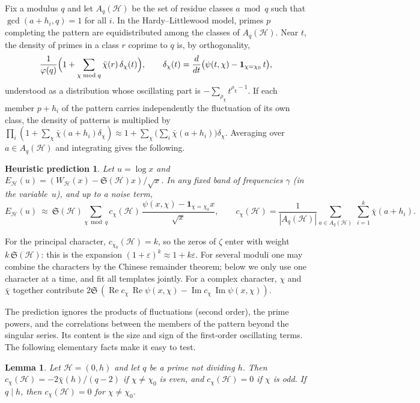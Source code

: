 \documentclass[11pt]{amsart}
\newtheorem{conjecture}{Heuristic prediction}
\newtheorem{lemma}{Lemma}
\theoremstyle{remark}
\newcommand{\Sing}{\mathfrak{S}}
\newcommand{\cH}{\mathcal{H}}
\begin{document}
Fix a modulus $q$ and let $A_q(\cH)$ be the set of residue classes $a\bmod q$ such that $\gcd(a+h_i,q)=1$ for all $i$. In the Hardy--Littlewood model, primes $p$ completing the pattern are equidistributed among the classes of $A_q(\cH)$. Near $t$, the density of primes in a class $r$ coprime to $q$ is, by orthogonality,
\[
\frac{1}{\varphi(q)}\Bigl(1+\sum_{\chi\bmod q}\bar\chi(r)\,\delta_\chi(t)\Bigr),
\qquad \delta_\chi(t)=\frac{d}{dt}\bigl(\psi(t,\chi)-\mathbf 1_{\chi=\chi_0}\,t\bigr),
\]
understood as a distribution whose oscillating part is $-\sum_{\rho_\chi}t^{\rho_\chi-1}$. If each member $p+h_i$ of the pattern carries independently the fluctuation of its own class, the density of patterns is multiplied by $\prod_i(1+\sum_\chi\bar\chi(a+h_i)\delta_\chi)\approx 1+\sum_\chi\bigl(\sum_i\bar\chi(a+h_i)\bigr)\delta_\chi$. Averaging over $a\in A_q(\cH)$ and integrating gives the following.

\begin{conjecture}\label{conj}
Let $u=\log x$ and $E_\cH(u)=(W_\cH(x)-\Sing(\cH)x)/\sqrt{x}$. In any fixed band of frequencies $\gamma$ (in the variable~$u$), and up to a noise term,
\begin{equation}\label{eq:pred}
E_\cH(u)\ \approx\ \Sing(\cH)\sum_{\chi\bmod q} c_\chi(\cH)\,\frac{\psi(x,\chi)-\mathbf 1_{\chi=\chi_0}x}{\sqrt{x}},
\qquad
c_\chi(\cH)=\frac{1}{|A_q(\cH)|}\sum_{a\in A_q(\cH)}\ \sum_{i=1}^k\bar\chi(a+h_i).
\end{equation}
\end{conjecture}

For the principal character, $c_{\chi_0}(\cH)=k$, so the zeros of $\zeta$ enter with weight $k\,\Sing(\cH)$: this is the expansion $(1+\varepsilon)^k\approx 1+k\varepsilon$. For several moduli one may combine the characters by the Chinese remainder theorem; below we only use one character at a time, and fit all templates jointly. For a complex character, $\chi$ and $\bar\chi$ together contribute $2\Sing\,(\operatorname{Re}c_\chi\,\operatorname{Re}\psi(x,\chi)-\operatorname{Im}c_\chi\,\operatorname{Im}\psi(x,\chi))$.

The prediction ignores the products of fluctuations (second order), the prime powers, and the correlations between the members of the pattern beyond the singular series. Its content is the size and sign of the first-order oscillating terms. The following elementary facts make it easy to test.

\begin{lemma}\label{lem:pairs}
Let $\cH=(0,h)$ and let $q$ be a prime not dividing $h$. Then $c_\chi(\cH)=-2\bar\chi(h)/(q-2)$ if $\chi\ne\chi_0$ is even, and $c_\chi(\cH)=0$ if $\chi$ is odd. If $q\mid h$, then $c_\chi(\cH)=0$ for $\chi\ne\chi_0$.
\end{lemma}
\end{document}

